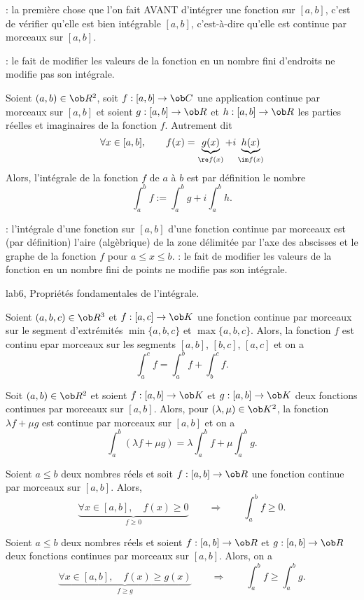 \Remarque: la première chose que l'on fait AVANT d'intégrer une fonction sur $[a,b]$, c'est de vérifier qu'elle est bien intégrable $[a,b]$, c'est-à-dire qu'elle est continue par morceaux sur $[a,b]$. 
\bigskip

\Remarque : le fait de modifier les valeurs de la fonction en un nombre fini d'endroits ne modifie pas son intégrale. 
\bigskip

\Definition []  Soient $(a,b)\in\ob R^2$, soit $f:[a,b]\to\ob C$ une application continue par morceaux sur $[a,b]$ et soient $g:[a,b]\to\ob R$ et $h:[a,b]\to\ob R$ les parties réelles et imaginaires de la fonction $f$. Autrement dit 
$$
\forall x\in[a,b], \qquad f(x)=\underbrace{g(x)}_{\re f(x)}+i\underbrace{h(x)}_{\im f(x)}
$$
Alors, l'intégrale de la fonction $f$ de $a$ à $b$ est par définition le nombre 
$$
\int_a^bf:=\int_a^bg+i\int_a^bh.
$$

\Remarque : l'intégrale d'une fonction sur $[a,b]$ d'une fonction continue par morceaux est (par définition) l'aire (algèbrique) de la zone délimitée par l'axe des abscisses et le graphe de la fonction $f$ pour $a\le x\le b$. 
\bigskip
\Remarque  : le fait de modifier les valeurs de la fonction en un nombre fini de points ne modifie pas son intégrale. 
\bigskip

\Subsection lab6, Propriétés fondamentales de l'intégrale. 
\bigskip

\Propriete [Title=Relation de Chasles]
Soient $(a,b,c)\in\ob R^3$ et $f:[a,c]\to\ob K$ une fonction continue par morceaux sur le segment d'extrémités $\min\{a,b,c\}$ et $\max\{a,b,c\}$. Alors, la fonction $f$ est continu epar morceaux sur les segments $[a,b]$, $[b,c]$, $[a,c]$ et on a 
$$
\int_a^cf=\int_a^bf+\int_b^cf. 
$$

\Propriete [Title=Linéarité de l'intégrale]
Soit $(a,b)\in\ob R^2$ et soient $f:[a,b]\to\ob K$ et $g:[a,b]\to\ob K$ deux fonctions continues par morceaux sur $[a,b]$. Alors, pour $(\lambda,\mu)\in\ob K^2$, la fonction $\lambda f+\mu g$ est continue par morceaux sur $[a,b]$ et on a 
$$
\int_a^b(\lambda f+\mu g)=\lambda \int_a^bf+\mu \int_a^bg. 
$$

\Propriete [Title=positivité de l'intégrale]
Soient $a\le b$ deux nombres réels et soit $f:[a,b]\to\ob R$ une fonction continue par morceaux sur $[a,b]$. Alors, 
$$
\underbrace{
\forall x\in[a,b],\quad f(x)\ge0}_{f\ge0}\qquad\Longrightarrow\qquad \int_a^bf\ge0.
$$ 
\bigskip


\Propriete [Title=Croissance de l'intégrale]
Soient $a\le b$ deux nombres réels et soient $f:[a,b]\to\ob R$ et $g:[a,b]\to\ob R$ deux fonctions continues par morceaux sur $[a,b]$. Alors, on a 
$$
\underbrace{
\forall x\in[a,b],\quad f(x)\ge g(x)}_{f\ge g}\qquad\Longrightarrow\qquad \int_a^bf\ge \int_a^bg.
$$ 

